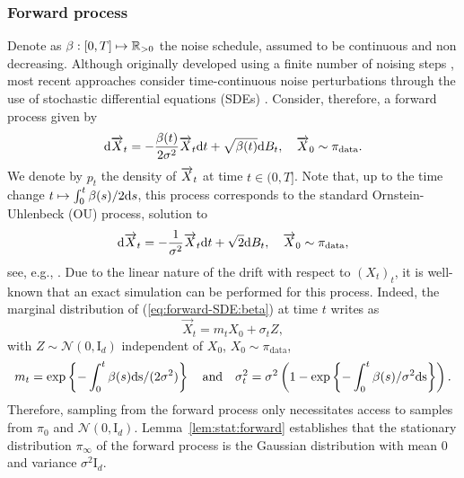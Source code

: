 \documentclass[english,graybox,envcountchap,envcountsame,sectrefs,shortlabels]{svmono}
\theoremstyle{style}
\newcommand{\eqsp}{}
\begin{document}
\subsubsection*{Forward process}
Denote as $\beta : [0,T] \mapsto \mathbb{R}_{>0}$ the noise schedule, assumed to be continuous and non decreasing.
Although originally developed using a finite number of noising steps \cite{dickstein2015, song2019generative, ho2020denoising}, most recent approaches consider time-continuous noise perturbations through the use of stochastic differential equations (SDEs) \cite{song2021score}. 
Consider, therefore, a forward process given by
\begin{equation} \label{eq:forward-SDE:beta}
    \rmd  \overrightarrow{X}_t = - \frac{\sched(t)}{2 \sigma^2}  \overrightarrow{X}_t \rmd t + \sqrt{ \sched(t)}  \rmd B_t, \quad \ora{X}_0 \sim \pi_{\mathrm{data}}\eqsp. 
\end{equation} 
We denote by $p_t$ the density of $\overrightarrow X_t$ at time $t \in (0, T]$.
Note that, up to the time change  $t\mapsto \int_0^t\beta(s) / 2\mathrm{d} s$, this process corresponds to the standard Ornstein-Uhlenbeck (OU) process, solution to
\begin{align*}
    \rmd  \overrightarrow{X}_t = - \frac{1}{\sigma^2}  \overrightarrow{X}_t \rmd t + \sqrt{ 2}  \rmd B_t, \quad \ora{X}_0 \sim \pi_{\mathrm{data}}\eqsp,
\end{align*}
see, e.g., \cite[Chapter 3]{karatzas2012brownian}. 
Due to the linear nature of the drift with respect to $(X_t)_t$, it is well-known that an exact simulation can be performed for this process. Indeed, the marginal distribution of (\ref{eq:forward-SDE:beta}) at time $t$ writes as 
\begin{equation}
\label{eq:noised:data}
 \overrightarrow X_t = m_t X_0 + \sigma_t Z\eqsp,
\end{equation}
with 
$Z \sim \mathcal{N} \left( 0, \mathrm{I}_d \right)$ independent of $X_0$, $X_0 \sim \pi_{\mathrm{data}}$, 
\begin{equation}
\label{eq:def:m:sigma}
m_t = \exp\left\{-\int_0^t \beta(s) \rm d s/(2 \sigma^2)\right\} \quad \mathrm{and} \quad \sigma^2_t = \sigma^2 \left( 1 - \exp\left\{- \int_0^t \beta(s)/\sigma^2 \rm d s\right\}\right)\eqsp.
\end{equation}
Therefore, sampling from the forward process only necessitates access to samples from $\pi_0$ and $\mathcal{N}(0,\mathrm{I}_d)$. Lemma~\ref{lem:stat:forward} establishes that the stationary distribution $\pi_{\infty}$ of the forward process is the Gaussian distribution with mean $0$ and variance $\sigma^2 \mathrm{I}_d$.
\end{document}

